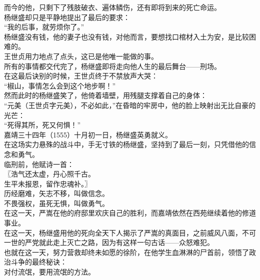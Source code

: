 \begin{multicols}{\theparacolNo}
而今的他，只剩下了残肢破衣、遍体鳞伤，还有即将到来的死亡命运。\\

杨继盛却只是平静地提出了最后的要求：\\

“我的后事，就劳烦你了。”\\

杨继盛没有钱，他的妻子也没有钱，对他而言，要想找口棺材入土为安，是比较困难的。\\

王世贞用力地点了点头，这已是他唯一能做的事。\\

所有的事情都交代完了，杨继盛即将走向他人生的最后舞台——刑场。\\

在这最后诀别的时候，王世贞终于不禁放声大哭：\\

“椒山，事情怎么会到这个地步啊！”\\

然而此时的杨继盛笑了，他倚着墙壁，用残腿支撑着自己的身体：\\

“元美（王世贞字元美），不必如此，”在昏暗的牢房中，他的脸上映射出无比自豪的光芒：\\

“死得其所，死又何惧！”\\

嘉靖三十四年（1555）十月初一日，杨继盛英勇就义。\\

在这场实力悬殊的战斗中，手无寸铁的杨继盛，坚持到了最后一刻，只凭借他的信念和勇气。\\

临刑前，他赋诗一首：\\

〖浩气还太虚，丹心照千古。\\

生平未报恩，留作忠魂补。〗\\

历经磨难，矢志不移，叫做信念。\\

不畏强权，虽死无惧，叫做勇气。\\

在这一天，严嵩在他的府邸里欢庆自己的胜利，而嘉靖依然在西苑继续着他的修道事业。\\

在这一天，杨继盛用他的死向全天下人揭示了严嵩的真面目，之前威风八面，不可一世的严党就此走上灭亡之路，因为有这样一句古话——众怒难犯。\\

也就在这一天，努力营救却终未如愿的徐阶，在他学生血淋淋的尸首前，领悟了政治斗争的最终秘诀：\\

对付流氓，要用流氓的方法。\\
\ifnum{}
	\end{multicols}
\fi
\newpage
